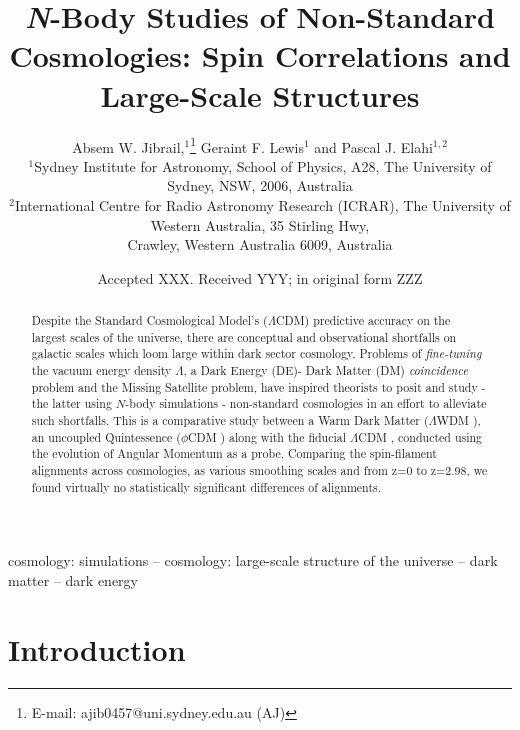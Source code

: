 \documentclass[a4paper,fleqn,usenatbib]{mnras}
\title[\textit{N}-Body Studies of Non-Standard Cosmologies]{ \textit{N}-Body Studies of Non-Standard Cosmologies: Spin Correlations and Large-Scale Structures }
\author[A. W. Jibrail et al.]{
Absem W. Jibrail,$^{1}$\thanks{E-mail: ajib0457@uni.sydney.edu.au (AJ)}
Geraint F. Lewis$^{1}$
and Pascal J. Elahi$^{1,2}$
\\
$^{1}$Sydney Institute for Astronomy, School of Physics, A28, The University of Sydney, NSW, 2006, Australia\\
$^{2}$International Centre for Radio Astronomy Research (ICRAR), The University of Western Australia, 35 Stirling Hwy, \\
Crawley, Western Australia 6009, Australia}
\date{Accepted XXX. Received YYY; in original form ZZZ}
\def \lcdm{$\Lambda$CDM }
\def \lwdm{$\Lambda$WDM }
\def \qcdm{$\phi$CDM }
\begin{document}
\label{firstpage}
\pagerange{\pageref{firstpage}--\pageref{lastpage}}
\maketitle

\begin{abstract}
Despite the Standard Cosmological Model's ($\Lambda$CDM) predictive accuracy on the largest scales of the universe, there are conceptual and observational shortfalls on galactic scales which loom large within dark sector cosmology. Problems of \textit{fine-tuning} the vacuum energy density $\Lambda$, a Dark Energy (DE)- Dark Matter (DM) \textit{coincidence} problem and the Missing Satellite problem, have inspired theorists to posit and study - the latter using $N$-body simulations - non-standard cosmologies in an effort to alleviate such shortfalls. This is a comparative study between a Warm Dark Matter (\lwdm), an uncoupled Quintessence (\qcdm) along with the fiducial \lcdm, conducted using the evolution of Angular Momentum as a probe. Comparing the spin-filament alignments across cosmologies, as various smoothing scales and from z=0 to z=2.98, we found virtually no statistically significant differences of alignments. 

\end{abstract}

\begin{keywords}
cosmology: simulations -- cosmology: large-scale structure of the universe -- dark matter -- dark energy
\end{keywords}



\section{Introduction}
\end{document}
